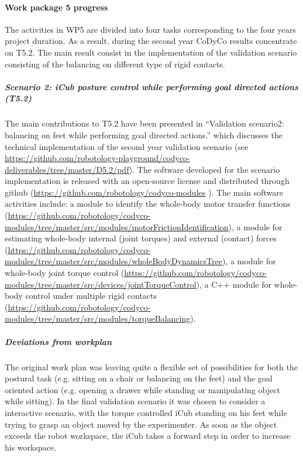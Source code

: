
\paragraph{Work package 5 progress}

The activities in WP5 are divided into four tasks corresponding to the four years project duration. As a result, during the second year CoDyCo results concentrate on T5.2. The main result consist in the implementation of the validation scenario consisting of the balancing on different type of rigid contacts.

\subparagraph{Scenario 2: iCub posture control while performing goal directed actions (T5.2)}

The main contributions to T5.2 have been presented in ``Validation scenario2: balancing on feet while performing goal directed actions.'' which discusses the technical implementation of the second year validation scenario (see \url{https://github.com/robotology-playground/codyco-deliverables/tree/master/D5.2/pdf}). The software developed for the scenario implementation is released with an open-source license and distributed through github (\url{https://github.com/robotology/codyco-modules} ). The main software activities include: a module to identify the whole-body motor transfer functions (\url{https://github.com/robotology/codyco-modules/tree/master/src/modules/motorFrictionIdentification}), a module for estimating whole-body internal (joint torques) and external (contact) forces (\url{https://github.com/robotology/codyco-modules/tree/master/src/modules/wholeBodyDynamicsTree}), a module for whole-body joint torque control (\url{https://github.com/robotology/codyco-modules/tree/master/src/devices/jointTorqueControl}), a C++ module for whole-body control under multiple rigid contacts (\url{https://github.com/robotology/codyco-modules/tree/master/src/modules/torqueBalancing}).

\subparagraph{Deviations from workplan}  

The original work plan was leaving quite a flexible set of possibilities for both the postural task (e.g. sitting on a chair or balancing on the feet) and the goal oriented action (e.g. opening a drawer while standing or manipulating object while sitting). In the final validation scenario it was chosen to consider a interactive scenario, with the torque controlled iCub standing on his feet while trying to grasp an object moved by the experimenter. As soon as the object exceeds the robot workspace, the iCub takes a forward step in order to increase his workspace. 

